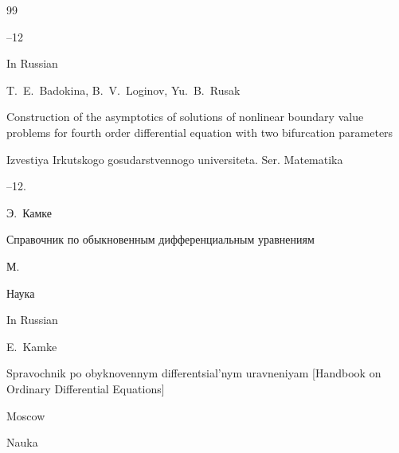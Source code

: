 \begin{thebibliography}{99}



--12

\misctransl

\lang In Russian

\by T.~E.~Badokina, B.~V.~Loginov, Yu.~B.~Rusak

\paper Construction of the asymptotics of solutions of nonlinear boundary value problems for fourth order differential equation with two bifurcation parameters 

\jour Izvestiya Irkutskogo gosudarstvennogo universiteta. Ser. Matematika




--12.








\by Э.~Камке

\book Справочник по обыкновенным дифференциальным уравнениям

\publaddr М.

\publ Наука



\misctransl

\lang In Russian

\by E.~Kamke

\book Spravochnik po obyknovennym differentsial'nym uravneniyam \rm [Handbook on Ordinary Differential Equations]

\publaddr Moscow

\publ Nauka







\end{thebibliography}




%






